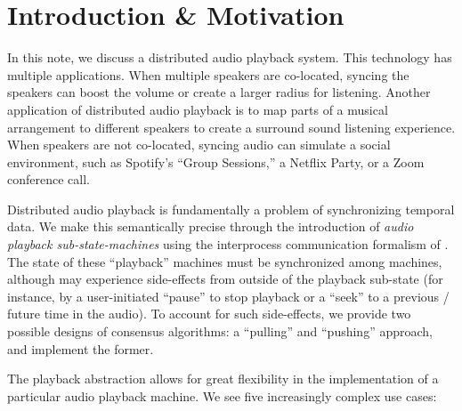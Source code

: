 \documentclass[%
               nonacm,sigconf,10pt]{acmart}
\begin{document}

\maketitle
\thispagestyle{firstfancy}

\section{Introduction \& Motivation}\label{sec:intro}

In this note, we discuss a distributed audio playback system. This technology has multiple applications. When multiple speakers are co-located, syncing the speakers can boost the volume or create a larger radius for listening. Another application of distributed audio playback is to map parts of a musical arrangement to different speakers to create a surround sound listening experience. When speakers are not co-located, syncing audio can simulate a social environment, such as Spotify's ``Group Sessions,'' a Netflix Party, or a Zoom conference call.

Distributed audio playback is fundamentally a problem of synchronizing temporal data. We make this semantically precise through the introduction of {\it audio playback sub-state-machines} using the interprocess communication formalism of \citet{Lam86}. The state of these ``playback'' machines must be synchronized among machines, although may experience side-effects from outside of the playback sub-state (for instance, by a user-initiated ``pause'' to stop playback or a ``seek'' to a previous / future time in the audio). To account for such side-effects, we provide two possible designs of consensus algorithms: a ``pulling'' and ``pushing'' approach, and implement the former. 

The playback abstraction allows for great flexibility in the implementation of a particular audio playback machine. We see five increasingly complex use cases:
\end{document}
